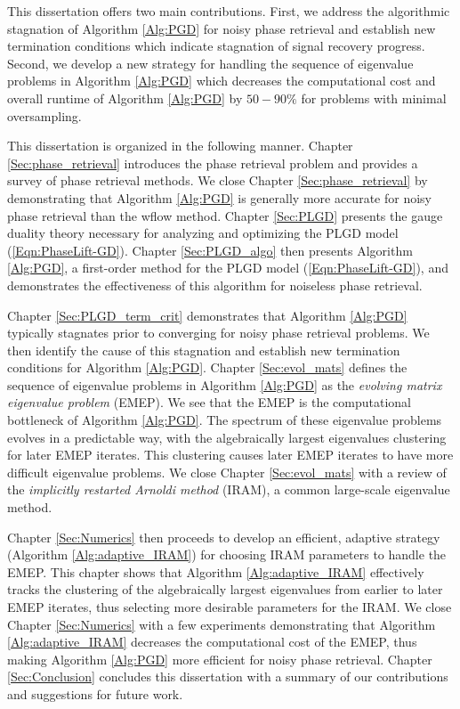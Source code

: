 This dissertation offers two main contributions.  
First, we address the algorithmic stagnation of Algorithm \ref{Alg:PGD} for noisy phase retrieval and establish new termination conditions which indicate stagnation of signal recovery progress.  
Second, we develop a new strategy for handling the sequence of eigenvalue problems in Algorithm \ref{Alg:PGD} which decreases the computational cost and overall runtime of Algorithm \ref{Alg:PGD} by $50-90\%$ for problems with minimal oversampling.


This dissertation is organized in the following manner.  
Chapter \ref{Sec:phase_retrieval} introduces the phase retrieval problem and provides a survey of phase retrieval methods.  
We close Chapter \ref{Sec:phase_retrieval} by demonstrating that Algorithm \ref{Alg:PGD} is generally more accurate for noisy phase retrieval than the wflow method.
Chapter \ref{Sec:PLGD} presents the gauge duality theory necessary for analyzing and optimizing the PLGD model (\ref{Eqn:PhaseLift-GD}).
Chapter \ref{Sec:PLGD_algo} then presents Algorithm \ref{Alg:PGD}, a first-order method for the PLGD model (\ref{Eqn:PhaseLift-GD}), and demonstrates the effectiveness of this algorithm for noiseless phase retrieval.

Chapter \ref{Sec:PLGD_term_crit} demonstrates that Algorithm \ref{Alg:PGD} typically stagnates prior to converging for noisy phase retrieval problems. 
We then identify the cause of this stagnation and establish new termination conditions for Algorithm \ref{Alg:PGD}.
Chapter \ref{Sec:evol_mats} defines the sequence of eigenvalue problems in Algorithm \ref{Alg:PGD} as the \textit{evolving matrix eigenvalue problem} (EMEP).
We see that the EMEP is the computational bottleneck of Algorithm \ref{Alg:PGD}.
The spectrum of these eigenvalue problems evolves in a predictable way, with the algebraically largest eigenvalues clustering for later EMEP iterates.
This clustering causes later EMEP iterates to have more difficult eigenvalue problems.
We close Chapter \ref{Sec:evol_mats} with a review of the \textit{implicitly restarted Arnoldi method} (IRAM), a common large-scale eigenvalue method.

Chapter \ref{Sec:Numerics} then proceeds to develop an efficient, adaptive strategy (Algorithm \ref{Alg:adaptive_IRAM}) for choosing IRAM parameters to handle the EMEP.
This chapter shows that Algorithm \ref{Alg:adaptive_IRAM} effectively tracks the clustering of the algebraically largest eigenvalues from earlier to later EMEP iterates, thus selecting more desirable parameters for the IRAM.
We close Chapter \ref{Sec:Numerics} with a few experiments demonstrating that Algorithm \ref{Alg:adaptive_IRAM} decreases the computational cost of the EMEP, thus making Algorithm \ref{Alg:PGD} more efficient for noisy phase retrieval.
Chapter \ref{Sec:Conclusion} concludes this dissertation with a summary of our contributions and suggestions for future work.




